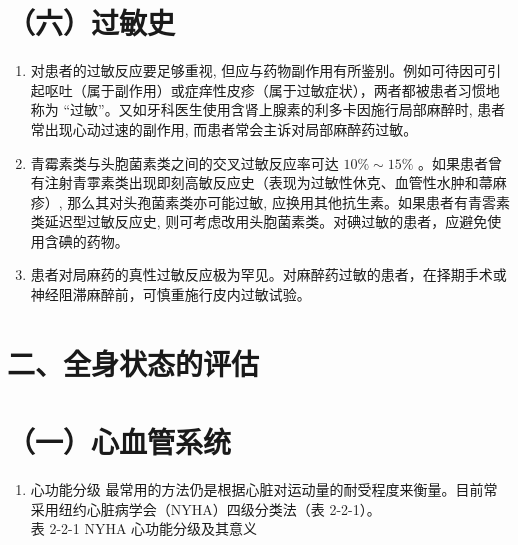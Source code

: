 \documentclass[10pt]{article}
\begin{document}
\section*{（六）过敏史}
\begin{enumerate}
  \item 对患者的过敏反应要足够重视, 但应与药物副作用有所鉴别。例如可待因可引起呕吐（属于副作用）或症痒性皮疹（属于过敏症状），两者都被患者习惯地称为 “过敏”。又如牙科医生使用含肾上腺素的利多卡因施行局部麻醉时, 患者常出现心动过速的副作用, 而患者常会主诉对局部麻醉药过敏。

  \item 青霉素类与头胞菌素类之间的交叉过敏反应率可达 $10 \% \sim 15 \%$ 。如果患者曾有注射青雽素类出现即刻高敏反应史（表现为过敏性休克、血管性水肿和菷麻疹）, 那么其对头孢菌素类亦可能过敏, 应换用其他抗生素。如果患者有青䨐素类延迟型过敏反应史, 则可考虑改用头胞菌素类。对碘过敏的患者，应避免使用含碘的药物。

  \item 患者对局麻药的真性过敏反应极为罕见。对麻醉药过敏的患者，在择期手术或神经阻滞麻醉前，可慎重施行皮内过敏试验。

\end{enumerate}

\section*{二、全身状态的评估}
\section*{（一）心血管系统}
\begin{enumerate}
  \item 心功能分级 最常用的方法仍是根据心脏对运动量的耐受程度来衡量。目前常采用纽约心脏病学会（NYHA）四级分类法（表 2-2-1）。\\
表 2-2-1 NYHA 心功能分级及其意义
\end{enumerate}
\end{document}
